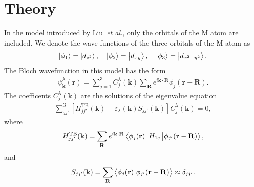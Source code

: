 \documentclass{article}
\newcommand{\thesistitlee}{title}
\newcommand{\graddate}{Ho Chi Minh City, 2025}
\begin{document}
%			
%			
%
\section{Theory}
\noindent In the model introduced by Liu~\textit{et al.}, only the orbitals of the M atom are included. We denote the wave functions of the three orbitals of the M atom as
\begin{gather}
	\ket{\phi_{1}} = \ket{d_{z^{2}}} , \quad \ket{\phi_{2}} = \ket{d_{xy}} , \quad \ket{\phi_{3}} = \ket{d_{x^{2} - y^{2}}}.
\end{gather}
The Bloch wavefunction in this model has the form
\begin{gather}
	\psi_{\mathbf{k}}^{\lambda} (\mathbf{r}) = \sum_{j=1}^{3} C_{j}^{\lambda}(\mathbf{k}) \sum_{\mathbf{R}} e^{i \mathbf{k \cdot R}} \phi_{j}(\mathbf{r} - \mathbf{R}).
\end{gather}
The coefficents $C_{j}^{\lambda}(\mathbf{k})$ are the solutions of the eigenvalue equation
\begin{gather}
	\sum_{jj'}^{3} \left[H_{jj'}^{\text{TB}}(\mathbf{k}) - \varepsilon_{\lambda}(\mathbf{k}) S_{jj'}(\mathbf{k})\right] C_{j}^{\lambda}(\mathbf{k}) = 0,
\end{gather}
where
\begin{equation}
	\begin{aligned}
		H_{jj'}^{\text{TB}}(\mathbf{k}) = \sum_{\mathbf{R}} e^{i \mathbf{k \cdot R}} \bra{\phi_{j}(\mathbf{r})} H_{\text{1e}} \ket{\phi_{j'}(\mathbf{r - R})},
	\end{aligned}
\end{equation}
and
\begin{equation}
	\begin{aligned}
		S_{jj'}(\mathbf{k}) = \sum_{\mathbf{R}} \bra{\phi_{j}(\mathbf{r})} \ket{\phi_{j'}(\mathbf{r - R})} \approx \delta_{jj'}.
	\end{aligned}
\end{equation}
\end{document}

